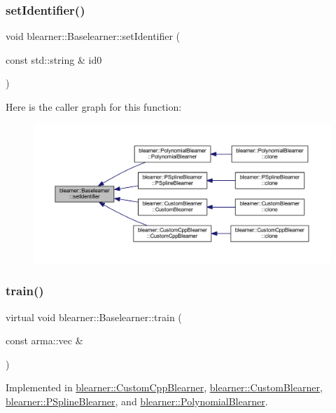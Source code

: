 \subsubsection{\texorpdfstring{set\+Identifier()}{setIdentifier()}}
{\footnotesize\ttfamily void blearner\+::\+Baselearner\+::set\+Identifier (\begin{DoxyParamCaption}\item[{const std\+::string \&}]{id0 }\end{DoxyParamCaption})}

Here is the caller graph for this function\+:
\nopagebreak
\begin{figure}[H]
\begin{center}
\leavevmode
\includegraphics[width=350pt]{classblearner_1_1_baselearner_a6669906a481cbdd516dce8df6f6e5b76_icgraph}
\end{center}
\end{figure}
\mbox{\label{classblearner_1_1_baselearner_a40e03ad070b9a03aae706d9ee8094b80}} 
\subsubsection{\texorpdfstring{train()}{train()}}
{\footnotesize\ttfamily virtual void blearner\+::\+Baselearner\+::train (\begin{DoxyParamCaption}\item[{const arma\+::vec \&}]{ }\end{DoxyParamCaption})\hspace{0.3cm}{\ttfamily [pure virtual]}}



Implemented in \mbox{\hyperlink{classblearner_1_1_custom_cpp_blearner_aa71b777d7092a3d9b47a9bed125eb0f9}{blearner\+::\+Custom\+Cpp\+Blearner}}, \mbox{\hyperlink{classblearner_1_1_custom_blearner_a4726c5b861b67817f7b3eb61d8f6c0d7}{blearner\+::\+Custom\+Blearner}}, \mbox{\hyperlink{classblearner_1_1_p_spline_blearner_aa5c18ceb8396ffce556588486d574be8}{blearner\+::\+P\+Spline\+Blearner}}, and \mbox{\hyperlink{classblearner_1_1_polynomial_blearner_acf24025a73293a2569450dd4659e0997}{blearner\+::\+Polynomial\+Blearner}}.

